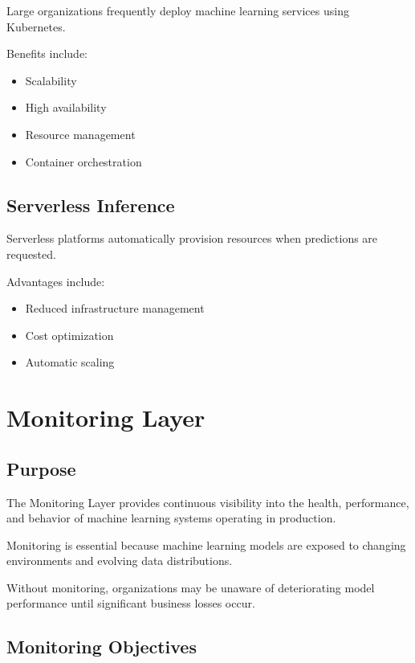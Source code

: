 Large organizations frequently deploy machine learning services using Kubernetes.

Benefits include:

\begin{itemize}
    \item Scalability
    \item High availability
    \item Resource management
    \item Container orchestration
\end{itemize}

\subsection{Serverless Inference}

Serverless platforms automatically provision resources when predictions are requested.

Advantages include:

\begin{itemize}
    \item Reduced infrastructure management
    \item Cost optimization
    \item Automatic scaling
\end{itemize}

\section{Monitoring Layer}

\subsection{Purpose}

The Monitoring Layer provides continuous visibility into the health, performance, and behavior of machine learning systems operating in production.

Monitoring is essential because machine learning models are exposed to changing environments and evolving data distributions.

Without monitoring, organizations may be unaware of deteriorating model performance until significant business losses occur.

\subsection{Monitoring Objectives}

